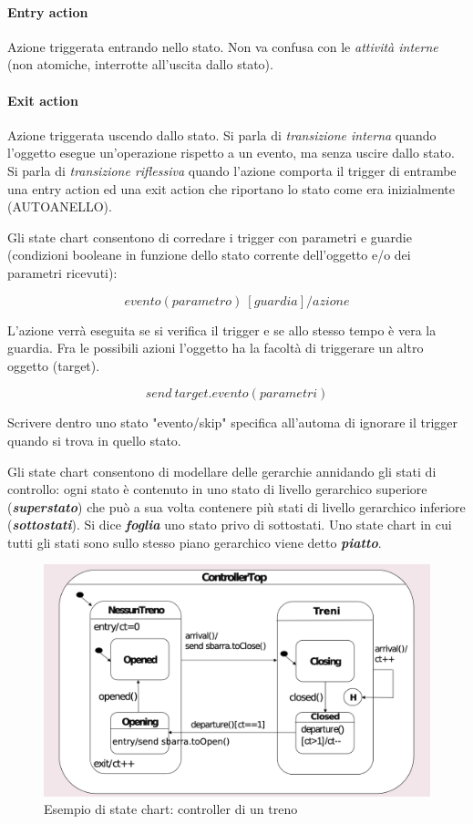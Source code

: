 \paragraph{Entry action} Azione triggerata entrando nello stato. Non va confusa con le \textit{attività interne} (non atomiche, interrotte all'uscita dallo stato).

\paragraph{Exit action} Azione triggerata uscendo dallo stato. Si parla di \textit{transizione interna} quando l'oggetto esegue un'operazione rispetto a un evento, ma senza uscire dallo stato. Si parla di \textit{transizione riflessiva} quando l'azione comporta il trigger di entrambe una entry action ed una exit action che riportano lo stato come era inizialmente (AUTOANELLO).

Gli state chart consentono di corredare i trigger con parametri e guardie (condizioni booleane in funzione dello stato corrente dell'oggetto e/o dei parametri ricevuti):

$$evento(parametro)\ [guardia]/azione$$

L'azione verrà eseguita se si verifica il trigger e se allo stesso tempo è vera la guardia. Fra le possibili azioni l'oggetto ha la facoltà di triggerare un altro oggetto (target).

$$send\ target.evento(parametri)$$

Scrivere dentro uno stato "evento/skip" specifica all'automa di ignorare il trigger quando si trova in quello stato.

Gli state chart consentono di modellare delle gerarchie annidando gli stati di controllo: ogni stato è contenuto in uno stato di livello gerarchico superiore (\textbf{\textit{superstato}}) che può a sua volta contenere più stati di livello gerarchico inferiore (\textbf{\textit{sottostati}}). Si dice \textbf{\textit{foglia}} uno stato privo di sottostati. Uno state chart in cui tutti gli stati sono sullo stesso piano gerarchico viene detto \textbf{\textit{piatto}}.

\begin{figure}[H]
    \centering
    \includegraphics[width=1\linewidth]{assets/UML/state/state4.png}
    \caption{Esempio di state chart: controller di un treno}
\end{figure}

